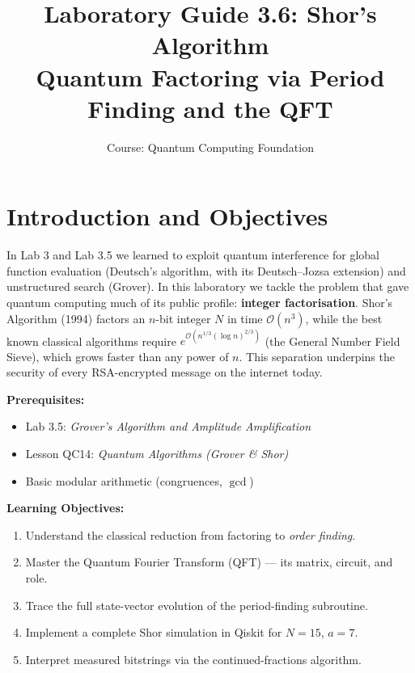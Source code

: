 \documentclass[a4paper,11pt]{article}
\title{\textbf{Laboratory Guide 3.6: Shor's Algorithm}\\
\large Quantum Factoring via Period Finding and the QFT}
\author{Course: Quantum Computing Foundation}
\date{}
\begin{document}
\maketitle
\tableofcontents
\newpage

\section{Introduction and Objectives}

In Lab 3 and Lab 3.5 we learned to exploit quantum interference for global
function evaluation (Deutsch's algorithm, with its Deutsch–Jozsa extension) and unstructured search (Grover).
In this laboratory we tackle the problem that gave quantum computing much of
its public profile: \textbf{integer factorisation}. Shor's Algorithm (1994)
factors an $n$-bit integer $N$ in time $\mathcal{O}(n^3)$, while the best
known classical algorithms require $e^{\mathcal{O}\left(n^{1/3}(\log n)^{2/3}\right)}$
(the General Number Field Sieve), which grows faster than any power of $n$. This separation underpins the
security of every RSA-encrypted message on the internet today.

\vspace{0.3cm}
\noindent\textbf{Prerequisites:}
\begin{itemize}
    \item Lab 3.5: \textit{Grover's Algorithm and Amplitude Amplification}
    \item Lesson QC14: \textit{Quantum Algorithms (Grover \& Shor)}
    \item Basic modular arithmetic (congruences, \(\gcd\))
\end{itemize}

\noindent\textbf{Learning Objectives:}
\begin{enumerate}
    \item Understand the classical reduction from factoring to \emph{order finding}.
    \item Master the Quantum Fourier Transform (QFT) — its matrix, circuit, and role.
    \item Trace the full state-vector evolution of the period-finding subroutine.
    \item Implement a complete Shor simulation in Qiskit for $N=15$, $a=7$.
    \item Interpret measured bitstrings via the continued-fractions algorithm.
\end{enumerate}
\end{document}
